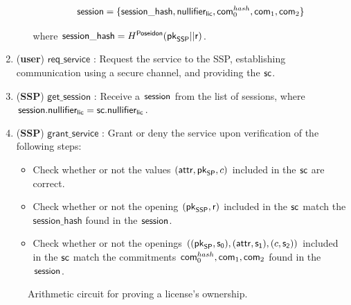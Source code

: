 \begin{enumerate}
\begin{itemize}
			$$\mathsf{session} = \{\mathsf{session\_hash}, \mathsf{nullifier_{lic}}, \mathsf{com}_0^{hash}, \mathsf{com}_1, \mathsf{com}_2\}$$

		where $\mathsf{session\_hash} = H^\mathsf{Poseidon}(\mathsf{pk}_{\mathsf{SSP}} || \mathsf{r})$.


	\end{itemize}

	\item (\textbf{user}) $\mathsf{req\_service}$ : Request the service to the SSP, establishing communication using a secure channel, and providing the $\mathsf{sc}$.

	\item (\textbf{SSP}) $\mathsf{get\_session}$ : Receive a $\mathsf{session}$ from the list of sessions, where $\mathsf{session}.\mathsf{nullifier_{lic}} = \mathsf{sc}.\mathsf{nullifier_{lic}}$.

	\item (\textbf{SSP}) $\mathsf{grant\_service}$ : Grant or deny the service upon verification of the following steps:

	\begin{itemize}
		\item Check whether or not the values $(\mathsf{attr}, \mathsf{pk}_{\mathsf{SP}}, c)$ included in the $\mathsf{sc}$ are correct.
		\item Check whether or not the opening $(\mathsf{pk}_{\mathsf{SSP}}, \mathsf{r})$ included in the $\mathsf{sc}$ match the $\mathsf{session\_hash}$ found in the $\mathsf{session}$.
		\item Check whether or not the openings $((\mathsf{pk}_{\mathsf{SP}}, \mathsf{s_0}), (\mathsf{attr}, \mathsf{s_1}), (c, \mathsf{s_2}))$ included in the $\mathsf{sc}$ match the commitments $\mathsf{com}_0^{hash}, \mathsf{com}_1, \mathsf{com}_2$ found in the $\mathsf{session}$.
	\end{itemize}

\end{enumerate}

\begin{figure}[h]
	\centering
	\setlength{\fboxsep}{5pt}%
	\setlength{\fboxrule}{0.3pt}%
	\caption{Arithmetic circuit for proving a license's ownership.}
	\label{fig:circuit_prove_nft}
\end{figure}

